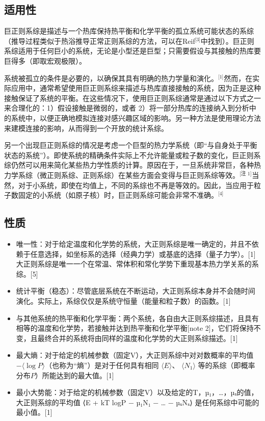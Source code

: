 \subsection{适用性}  
巨正则系综是描述与一个热库保持热平衡和化学平衡的孤立系统可能状态的系综（推导过程类似于热浴推导正常正则系综的方法，可以在Reif\(^\text{[3]}\)中找到）。巨正则系综适用于任何巨小的系统，无论是小型还是巨型；只需要假设与其接触的热库要巨得多（即取宏观极限）。

系统被孤立的条件是必要的，以确保其具有明确的热力学量和演化。\(^\text{[1]}\)然而，在实际应用中，通常希望使用巨正则系综来描述与热库直接接触的系统，因为正是这种接触保证了系统的平衡。在这些情况下，使用巨正则系综通常是通过以下方式之一来合理化的：1）假设接触是微弱的，或者 2）将一部分热库的连接纳入到分析中的系统中，以便正确地模拟连接对感兴趣区域的影响。另一种方法是使用理论方法来建模连接的影响，从而得到一个开放的统计系综。

另一个出现巨正则系综的情况是考虑一个巨型的热力学系统（即“与自身处于平衡状态的系统”）。即使系统的精确条件实际上不允许能量或粒子数的变化，巨正则系综仍然可以用来简化某些热力学性质的计算。原因在于，一旦系统非常巨，各种热力学系综（微正则系综、正则系综）在某些方面会变得与巨正则系综等效。\(^\text{[注 1]}\)当然，对于小系统，即使在均值上，不同的系综也不再是等效的。因此，当应用于粒子数固定的小系统（如原子核）时，巨正则系综可能会非常不准确。\(^\text{[4]}\)
\subsection{性质}  
\begin{itemize}
\item 唯一性：对于给定温度和化学势的系统，大正则系综是唯一确定的，并且不依赖于任意选择，如坐标系的选择（经典力学）或基底的选择（量子力学）。[1] 大正则系综是唯一一个在常温、常体积和常化学势下重现基本热力学关系的系综。[5]  
\item 统计平衡（稳态）：尽管底层系统在不断运动，大正则系综本身并不会随时间演化。实际上，系综仅仅是系统守恒量（能量和粒子数）的函数。[1]  
\item 与其他系统的热平衡和化学平衡：两个系统，各自由大正则系综描述，且具有相等的温度和化学势，若接触并达到热平衡和化学平衡[note 2]，它们将保持不变，且最终合并的系统将由同样的温度和化学势的大正则系综描述。[1]  
\item 最大熵：对于给定的机械参数（固定V），大正则系综中对对数概率的平均值 \( -\langle \log P \rangle \)（也称为“熵”）是对于任何具有相同 \( \langle E \rangle \)、 \( \langle N_1 \rangle \) 等的系综（即概率分布\(P\)）所能达到的最大值。[1] 
\item 最小大势能：对于给定的机械参数（固定V）以及给定的T，µ₁，…，µₛ的值，大正则系综的平均值  
⟨E + kT log⁡P − µ₁N₁ − … − µₛNₛ⟩  
是任何系综中可能的最小值。[1]
\end{itemize}